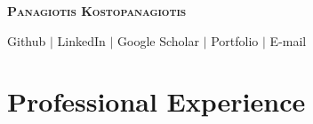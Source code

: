 \documentclass[11pt,a4paper,sans]{moderncv}        %
\begin{document}

\begin{center}
\textbf{\huge \scshape Panagiotis Kostopanagiotis} \\ \vspace{0.2pt}
\end{center}
\normalsize

\begin{center}
    \href{https://github.com/infinity4471}{\faGithub\quad}Github $|$ 
    \href{https://www.linkedin.com/in/panagiotis-kostopanagiotis/}{\faLinkedin\quad}LinkedIn $|$
    \href{https://scholar.google.com/citations?view_op=list_works&hl=el&authuser=1&user=mEFJGiMAAAAJ&gmla=AJsN-F7AG6GMnjNWHKMqmrMLTHoSdGik3cYIxSWlAARcf6wA49yMaZ8MlFmgtfgh82yVeL-rgo9BhVNVS6JNtQx7N1ktrM-j_YiEtQ2dT6TDLU6r3zYyMz26hvocSHDy2lEtj_FlfsTkqLOfRn57T2RDj-hzp8PEnKlLkwapYCYNFN2vHlvCdBO0jf0C_SYXrjiPWrbT4_iI}{\faGoogle\quad}Google Scholar $|$
    \href{https://infinity4471.github.io}{\faGlobe\quad}Portfolio $|$
    \href{mailto:panagiotis.kostopanagiotis@gmail.com}{\faEnvelope\quad}E-mail
 \end{center}
\section{Professional Experience}
\end{document}
